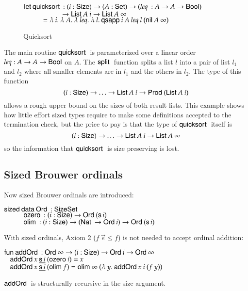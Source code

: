 \begin{figure}[htp]
{\begin{minipage}{0.8\textwidth}
\begin{bsp}
$\mathsf{let}\: \mathsf{quicksort}\: : (i : \mathsf{Size} ) \rightarrow (A : \mathsf{Set} ) \rightarrow (\mathit{leq}\: : A \rightarrow A \rightarrow \mathsf{Bool})$\\ 
$\spcx \spcx \ra \SList A\: i \ra \SList A\: \infty$\\
$\spcx = \lam{i}\lam{A}\lam{leq}\lam{l} \qsapp i\: A\: leq \: l \: (\nil A\: \infty)$ 
\end{bsp}
\end{minipage}
}
\caption{Quicksort}
\label{fsort}
\end{figure}

The main routine $\mathsf{quicksort}\:$ is parameterized over a linear order $leq : A \rightarrow A \rightarrow \mathsf{Bool}$ on $A$.
The $\mathsf{split}\:$ function splits a list $l$ into a pair of list $l_1$ and $l_2$ where all smaller elements are in $l_1$ and the others in $l_2$.
The type of this function  
\[ (i : \mathsf{Size} ) \rightarrow \ldots \rightarrow \mathsf{List}\: A \: i \rightarrow \mathsf{Prod}\: (\mathsf{List}\: A \: i) \]
\noindent allows a rough upper bound on the sizes of both result lists.
This example shows how little effort sized types require to make some definitions accepted
to the termination check, but the price to pay is that the type of $\mathsf{quicksort}\:$ itself is 
\[ (i : \mathsf{Size} ) \rightarrow \ldots \rightarrow \mathsf{List}\: A\: i \rightarrow \mathsf{List}\: A\: \infty \]
\noindent so the information that $\mathsf{quicksort}\:$ is size preserving is lost.

\subsection{Sized Brouwer ordinals}
Now sized Brouwer ordinals are introduced:
\begin{bsp}
$\mathsf{sized}\: \mathsf{data}\: \mathsf{Ord}\: : \mathsf{Size} \mathsf{Set}$ \\
$\spcx \ozero : (i : \Size ) \ra \SOrd (\s i) $\\
$\spcx \olim : ( i : \Size ) \ra (\Nat \ra \SOrd i) \ra \SOrd (\s i) $
\end{bsp}
With sized ordinals, Axiom 2 ($f \: \vec{e} \leq f$) is not needed to accept ordinal addition:
\begin{bsp}
$\mathsf{fun}\: \mathsf{addOrd}\: : \mathsf{Ord}\: \infty \rightarrow ( i : \mathsf{Size} ) \rightarrow{\mathsf{Ord}\:i \rightarrow\mathsf{Ord}\:\infty }$\\
$\hspace*{3mm} \mathsf{addOrd}\: x\: \underline{\mathsf{s}\, i}\: (\mathsf{ozero}\: i) = x $\\
$\hspace*{3mm} \mathsf{addOrd}\: x\: \underline{\mathsf{s}\, i}\: (\mathsf{olim}\: f)  = \mathsf{olim}\: \infty \: ( \lambda\: y .\: \mathsf{addOrd}\:  x \: i \: (f \: y))  $
\end{bsp}
$\mathsf{addOrd}\:$ is structurally recursive in the size argument.
